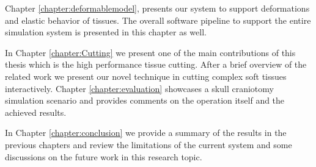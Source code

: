 Chapter \ref{chapter:deformablemodel}, presents our system to support deformations and elastic behavior
of tissues. The overall software pipeline to support the entire simulation system is presented 
in this chapter as well. 

In Chapter \ref{chapter:Cutting} we present one of the main contributions of this thesis which is the high 
performance tissue cutting. After a brief overview of the related work we present our novel technique 
in cutting complex soft tissues interactively. Chapter \ref{chapter:evaluation} showcases a skull craniotomy 
simulation scenario and provides comments on the operation itself and the achieved results.

In Chapter \ref{chapter:conclusion} we provide a summary of the results in the previous chapters and 
review the limitations of the current system and some discussions on the future work in this research topic.















